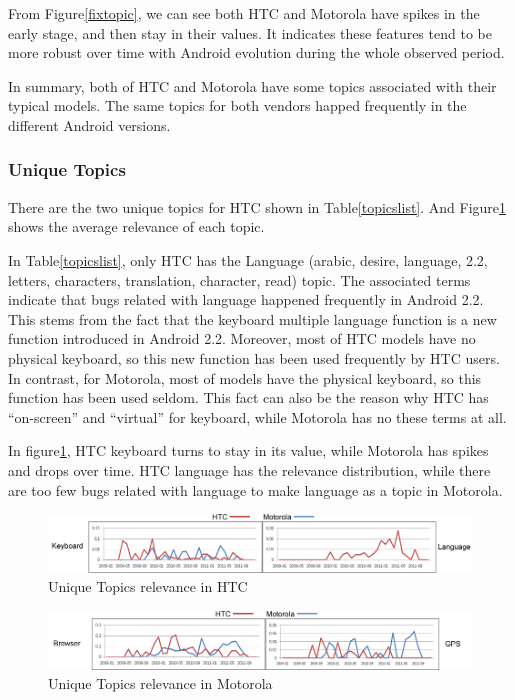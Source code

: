 \documentclass[10pt, conference, compsocconf]{IEEEtran}
\begin{document}
From Figure\ref{fixtopic}, we can see both HTC and Motorola have spikes in the early stage, and then stay in their values. It indicates these features tend to be more robust over time with Android evolution during the whole observed period.

In summary, both of HTC and Motorola have some topics associated with their typical models. The same topics for both vendors happed frequently in the different Android versions.

\subsubsection{Unique Topics}

There are the two unique topics for HTC shown in Table\ref{topicslist}. And Figure\ref{uniquehtc} shows the average relevance of each topic.

In Table\ref{topicslist}, only HTC has the Language (arabic, desire, language, 2.2, letters, characters, translation, character, read) topic. The associated terms indicate that bugs related with language happened frequently in Android 2.2. This stems from the fact that the keyboard multiple language function is a new function introduced in Android 2.2. Moreover, most of HTC models have no physical keyboard, so this new function has been used frequently by HTC users. In contrast, for Motorola, most of models have the physical keyboard, so this function has been used seldom. This fact can also be the reason why HTC has “on-screen” and “virtual” for keyboard, while Motorola has no these terms at all.

In figure\ref{uniquehtc}, HTC keyboard turns to stay in its value, while Motorola has spikes and drops over time. HTC language has the relevance distribution, while there are too few bugs related with language to make language as a topic in Motorola.

\begin{figure}[htb]
\centering
\includegraphics[width=1\textwidth]{uniquehtc.png}
\caption{Unique Topics relevance in HTC}
\label{uniquehtc}
\end{figure}

\begin{figure}[htb]
\centering
\includegraphics[width=1\textwidth]{uniquemoto.png}
\caption{Unique Topics relevance in Motorola}
\label{uniquemoto}
\end{figure}
\end{document}
